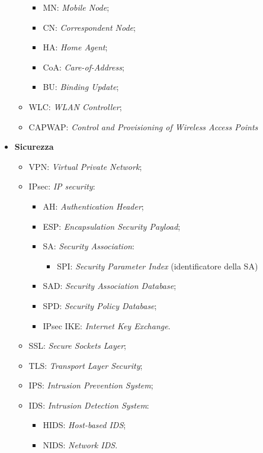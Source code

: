\begin{itemize}
\begin{itemize}
\begin{itemize}

\item{MN}: \emph{Mobile Node};
\item{CN}: \emph{Correspondent Node};
\item{HA}: \emph{Home Agent};
\item{CoA}: \emph{Care-of-Address};
\item{BU}: \emph{Binding Update};

\end{itemize}

\item{WLC}: \emph{WLAN Controller};
\item{CAPWAP}: \emph{Control and Provisioning of Wireless Access Points}

\end{itemize}


\item{\textbf{Sicurezza}}

\begin{itemize}

\item{VPN}: \emph{Virtual Private Network};\
\item{IPsec}: \emph{IP security}:

\begin{itemize}

\item{AH}: \emph{Authentication Header};
\item{ESP}: \emph{Encapsulation Security Payload};
\item{SA}: \emph{Security Association}:

\begin{itemize}
\item{SPI}: \emph{Security Parameter Index} (identificatore della SA)
\end{itemize}

\item{SAD}: \emph{Security Association Database};
\item{SPD}: \emph{Security Policy Database};
\item{IPsec IKE}: \emph{Internet Key Exchange}.

\end{itemize}

\item{SSL}: \emph{Secure Sockets Layer};
\item{TLS}: \emph{Transport Layer Security};
\item{IPS}: \emph{Intrusion Prevention System};
\item{IDS}: \emph{Intrusion Detection System}:

\begin{itemize}

\item{HIDS}: \emph{Host-based IDS};
\item{NIDS}: \emph{Network IDS}.
 
\end{itemize}

\end{itemize}

\end{itemize}